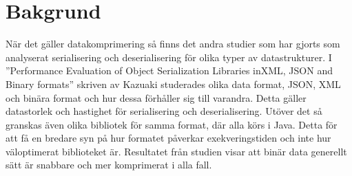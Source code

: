 \section{Bakgrund}
\label{sec:tim-background}
När det gäller datakomprimering så finns det andra studier som har gjorts som analyserat serialisering och deserialisering för olika typer av datastrukturer. I ''Performance Evaluation of Object Serialization Libraries inXML, JSON and Binary formats'' skriven av Kazuaki studerades olika data format, JSON, XML och binära format och hur dessa förhåller sig till varandra.\cite{serialization} Detta gäller datastorlek och hastighet för serialisering och deserialisering. Utöver det så granskas även olika bibliotek för samma format, där alla körs i Java. Detta för att få en bredare syn på hur formatet påverkar exekveringstiden och inte hur väloptimerat biblioteket är. Resultatet från studien visar att binär data generellt sätt är snabbare och mer komprimerat i alla fall.

